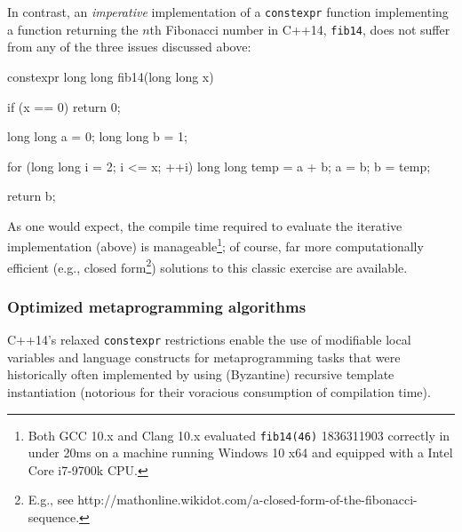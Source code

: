 In contrast, an \emph{imperative} implementation of a \lstinline!constexpr!
function implementing a function returning the $n$th Fibonacci
number in C++14, \lstinline!fib14!, does not suffer from any of the three
issues discussed above:

\begin{emcppslisting}[emcppsstandards={c++14}]
constexpr long long fib14(long long x)
{
    if (x == 0) { return 0; }

    long long a = 0;
    long long b = 1;

    for (long long i = 2; i <= x; ++i)
    {
        long long temp = a + b;
        a = b;
        b = temp;
    }

    return b;
}
\end{emcppslisting}
    
\noindent As one would expect, the compile time required to evaluate the iterative
implementation (above) is manageable{\cprotect\footnote{Both GCC 10.x
and Clang 10.x evaluated \lstinline!fib14(46)! 1836311903 correctly in
under 20ms on a machine running Windows 10 x64 and equipped with a
  Intel Core i7-9700k CPU.}}; of course, far more
computationally efficient (e.g., closed form{\cprotect\footnote{E.g.,
see
  http://mathonline.wikidot.com/a-closed-form-of-the-fibonacci-sequence.}})
solutions to this classic exercise are available.

\subsubsection[Optimized metaprogramming algorithms]{Optimized metaprogramming algorithms}\label{optimized-metaprogramming-algorithms}

C++14's relaxed \lstinline!constexpr! restrictions enable the use of
modifiable local variables and  language constructs
for metaprogramming tasks that were historically often implemented by
using (Byzantine) recursive template instantiation (notorious for their
voracious consumption of compilation time).

